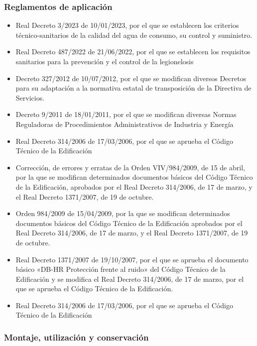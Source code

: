 \documentclass[../main.tex]{subfiles}
\begin{document}
\subsubsection{Reglamentos de aplicación}
\begin{itemize}
    \item Real Decreto 3/2023 de 10/01/2023, por el que se establecen los criterios técnico-sanitarios de la calidad del agua de consumo, su control y suministro.
    \item Real Decreto 487/2022 de 21/06/2022, por el que se establecen los requisitos sanitarios para la prevención y el control de la legionelosis
    \item Decreto 327/2012 de 10/07/2012, por el que se modifican diversos Decretos para su adaptación a la normativa estatal de transposición de la Directiva de Servicios.
    \item Decreto 9/2011 de 18/01/2011, por el que se modifican diversas Normas Reguladoras de Procedimientos Administrativos de Industria y Energía
    \item Real Decreto 314/2006 de 17/03/2006, por el que se aprueba el Código Técnico de la Edificación
    \item Corrección, de errores y erratas de la Orden VIV/984/2009, de 15 de abril, por la que se modifican determinados documentos básicos del Código Técnico de la Edificación, aprobados por el Real Decreto 314/2006, de 17 de marzo, y el Real Decreto 1371/2007, de 19 de octubre.
    \item Orden 984/2009 de 15/04/2009, por la que se modifican determinados documentos básicos del Código Técnico de la Edificación aprobados por el Real Decreto 314/2006, de 17 de marzo, y el Real Decreto 1371/2007, de 19 de octubre.
    \item Real Decreto 1371/2007 de 19/10/2007, por el que se aprueba el documento básico «DB-HR Protección frente al ruido» del Código Técnico de la Edificación y se modifica el Real Decreto 314/2006, de 17 de marzo, por el que se aprueba el Código Técnico de la Edificación.
    \item Real Decreto 314/2006 de 17/03/2006, por el que se aprueba el Código Técnico de la Edificación
\end{itemize}

\subsubsection{Montaje, utilización y conservación}
\end{document}
